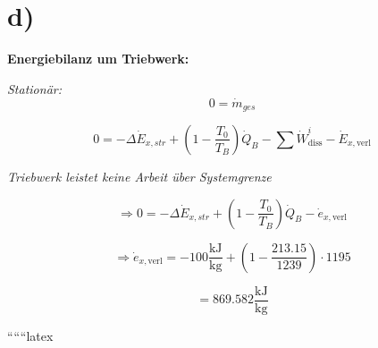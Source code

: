 

\section*{d)}

\textbf{Energiebilanz um Triebwerk:}

\textit{Stationär:} \[ 0 = \dot{m}_{ges} \]

\[ 0 = -\Delta \dot{E}_{x, str} + \left( 1 - \frac{T_0}{T_B} \right) \dot{Q}_B - \sum \dot{W}_{\text{diss}}^i - \dot{E}_{x, \text{verl}} \]

\textit{Triebwerk leistet keine Arbeit über Systemgrenze}

\[
\Rightarrow 0 = -\Delta \dot{E}_{x, str} + \left( 1 - \frac{T_0}{T_B} \right) \dot{Q}_B - \dot{e}_{x, \text{verl}}
\]

\[
\Rightarrow \dot{e}_{x, \text{verl}} = -100 \frac{\text{kJ}}{\text{kg}} + \left( 1 - \frac{213.15}{1239} \right) \cdot 1195
\]

\[
= 869.582 \frac{\text{kJ}}{\text{kg}}
\]

``````latex